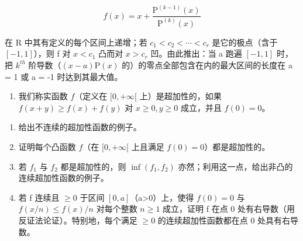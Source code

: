 \[
f (x) = x + \frac {\mathrm{P} ^ {(k - 1)} (x)}{\mathrm{P} ^ {(k)} (x)}
\]

在 R 中其有定义的每个区间上递增；若 \(c_{1} < c_{2} < \cdots < c_{r}\) 是它的极点（含于 \([-1, 1]\)），则 f 对 \(x < c_{1}\) 凸而对 \(x > c_{r}\) 凹。由此推出：当 a 跑遍 \([-1, 1]\) 时，把 \(k^{th}\) 阶导数（\((x - a)\mathrm{P}(x)\) 的）的零点全部包含在内的最大区间的长度在 a = 1 或 a = -1 时达到其最大值。

\begin{enumerate}
\def\labelenumi{\arabic{enumi})}
\setcounter{enumi}{24}
\tightlist
\item
  我们称实函数 \(f\)（定义在 \([0, +\infty[\) 上）是超加性的，如果 \(f(x + y) \geqslant f(x) + f(y)\) 对 \(x \geqslant 0, y \geqslant 0\) 成立，并且 \(f(0) = 0\)。
\end{enumerate}

\begin{enumerate}
\def\labelenumi{\alph{enumi})}
\item
  给出不连续的超加性函数的例子。
\item
  证明每个凸函数 \(f\)（在 \([0, +\infty[\) 上且满足 \(f(0) = 0\)）都是超加性的。
\item
  若 \(f_{1}\) 与 \(f_{2}\) 都是超加性的，则 \(\inf (f_1, f_2)\) 亦然；利用这一点，给出非凸的连续超加性函数的例子。
\item
  若 f 连续且 \(\geqslant0\) 于区间 \([0,a]\)（a\textgreater0）上，使得 \(f(0)=0\) 与 \(f(x/n)\leqslant f(x)/n\) 对每个整数 \(n\geqslant1\) 成立，证明 f 在点 0 处有右导数（用反证法论证）。特别地，每个满足 \(\geqslant0\) 的连续超加性函数都在点 0 处具有右导数。
\end{enumerate}

